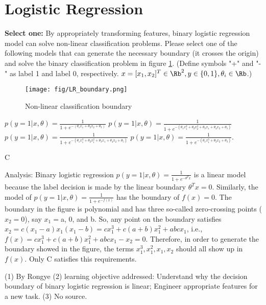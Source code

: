 \section{Logistic Regression}
\begin{questions}
\question [] \textbf{Select one:} By appropriately transforming features, binary logistic regression model can solve non-linear classification problems. Please select one of the following models that can generate the necessary boundary (it crosses the origin) and solve the binary classification problem in figure \ref{nonlinear_lr}. (Define symbols "+" and "-" as label 1 and label 0, respectively. $x = [x_1,x_2]^T \in \Rb^2, y \in \{0,1\}, \theta_i \in \Rb$.)

\begin{figure}[H]
        \centering
        \texttt{[image: fig/LR\_boundary.png]}
        \caption{Non-linear classification boundary}
        \label{nonlinear_lr}
\end{figure}

    {%
    \begin{checkboxes}
     \choice $p(y=1|x,\theta)=\frac{1}{1+e^{-(\theta_1 x_1+\theta_2 x_2+\theta_3)}}$
     \choice $p(y=1|x,\theta)=\frac{1}{1+e^{-(\theta_1 x_1^2+\theta_2 x_2^2+\theta_3 x_1 +\theta_4 x_2 + \theta_5)}}$
     \choice $p(y=1|x,\theta)=\frac{1}{1+e^{-(\theta_1 x_1^3 + \theta_2 x_1^2 + \theta_3 x_1 + \theta_4 x_2 + \theta_5)}}$
     \choice $p(y=1|x,\theta)=\frac{1}{1+e^{-(\theta_1 x_1^3+\theta_2 x_2+\theta_3)}}$.
    \end{checkboxes}
    }
    \begin{soln}
    C
    
    Analysis:
    Binary logistic regression $p(y=1|x,\theta)=\frac{1}{1+e^{-\theta^{T}x}}$ is a linear model because the label decision is made by the linear boundary $\theta^T x =0$. Similarly, the model of $p(y=1|x,\theta)=\frac{1}{1+e^{-f(x)}}$ has the boundary of $f(x)=0$. The boundary in the figure is polynomial and has three so-called zero-crossing points ($x_2=0$), say $x_1=$a, 0, and b. So, any point on the boundary satisfies $x_2=c(x_1-a)x_1(x_1-b)= cx_1^3+c(a+b)x_1^2+abcx_1$, i.e., $ f(x)=cx_1^3+c(a+b)x_1^2+abcx_1 -x_2 =0$. Therefore, in order to generate the boundary showed in the figure, the terms $x_1^3,x_1^2,x_1,x_2$ should all show up in $f(x)$. Only C satisfies this requirements.
    \end{soln}
    \begin{qauthor}
    (1) By Rongye 
    (2) learning objective addressed: Understand why the decision boundary of binary logistic regression is
linear; Engineer appropriate features for a new task.
    (3) No source.
    \end{qauthor}



\end{questions}
